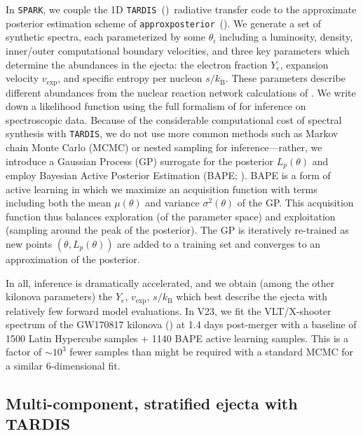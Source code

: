 \documentclass[twocolumn, twocolappendix]{aastex63}
\def\SPARK{\texttt{SPARK}}
\def\TARDIS{\texttt{TARDIS}}
\def\approxposterior{\texttt{approxposterior}}
\begin{document}
In \SPARK, we couple the 1D \TARDIS~(\citealt{kerzendorf14})~radiative transfer code to the approximate posterior estimation scheme of \approxposterior~(\citealt{fleming18,fleming20}). We generate a set of synthetic spectra, each parameterized by some $\theta_i$ including a luminosity, density, inner/outer computational boundary velocities, and three key parameters which determine the abundances in the ejecta: the electron fraction $Y_e$, expansion velocity $v_{\mathrm{exp}}$, and specific entropy per nucleon $s / k_{\mathrm{B}}$. These parameters describe different abundances from the nuclear reaction network calculations of \cite{wanajo18}. We write down a likelihood function using the full formalism of \cite{czekala15} for inference on spectroscopic data. Because of the considerable computational cost of spectral synthesis with \TARDIS, we do not use more common methods such as Markov chain Monte Carlo (MCMC) or nested sampling for inference---rather, we introduce a Gaussian Process (GP) surrogate for the posterior $L_p (\theta)$ and employ Bayesian Active Posterior Estimation (BAPE; \citealt{kandasamy17}). BAPE is a form of active learning in which we maximize an acquisition function with terms including both the mean $\mu(\theta)$ and variance $\sigma^2(\theta)$ of the GP. This acquisition function thus balances exploration (of the parameter space) and exploitation (sampling around the peak of the posterior). The GP is iteratively re-trained as new points $(\theta, L_p(\theta))$ are added to a training set and converges to an approximation of the posterior. 

In all, inference is dramatically accelerated, and we obtain (among the other kilonova parameters) the $Y_e$, $v_{\mathrm{exp}}$, $s / k_{\mathrm{B}}$ which best describe the ejecta with relatively few forward model evaluations. In V23, we fit the VLT/X-shooter spectrum of the GW170817 kilonova (\citealt{pian17, smartt17}) at 1.4 days post-merger with a baseline of 1500 Latin Hypercube samples + 1140 BAPE active learning samples. This is a factor of $\sim 10^3$ fewer samples than might be required with a standard MCMC for a similar 6-dimensional fit.


\subsection{Multi-component, stratified ejecta with \textsc{TARDIS}}\label{ssc:multi-component-TARDIS}
\end{document}
